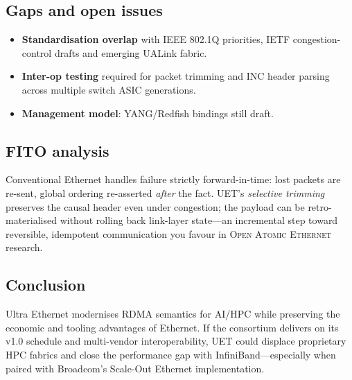 \subsection{Gaps and open issues}
\begin{itemize}
  \item \textbf{Standardisation overlap} with IEEE 802.1Q priorities,
        IETF congestion-control drafts and emerging UALink fabric.
  \item \textbf{Inter-op testing} required for packet trimming and INC
        header parsing across multiple switch ASIC generations.
  \item \textbf{Management model}: YANG/Redfish bindings still draft.
\end{itemize}

\subsection{FITO analysis}
Conventional Ethernet handles failure strictly forward-in-time:
lost packets are re-sent, global ordering re-asserted \emph{after}
the fact. UET’s \emph{selective trimming} preserves the causal
header even under congestion; the payload can be retro-materialised
without rolling back link-layer state—an incremental step toward
reversible, idempotent communication you favour in
\textsc{Open Atomic Ethernet} research.

\subsection{Conclusion}
Ultra Ethernet modernises RDMA semantics for AI/HPC while preserving
the economic and tooling advantages of Ethernet.  
If the consortium delivers on its v1.0 schedule and multi-vendor
interoperability, UET could displace proprietary HPC fabrics and close
the performance gap with InfiniBand—especially when paired with
Broadcom’s Scale-Out Ethernet implementation.

